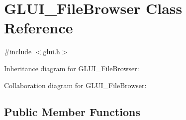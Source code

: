 \hypertarget{class_g_l_u_i___file_browser}{\section{G\+L\+U\+I\+\_\+\+File\+Browser Class Reference}
\label{class_g_l_u_i___file_browser}
}


{\ttfamily \#include $<$glui.\+h$>$}



Inheritance diagram for G\+L\+U\+I\+\_\+\+File\+Browser\+:


Collaboration diagram for G\+L\+U\+I\+\_\+\+File\+Browser\+:
\subsection*{Public Member Functions}
